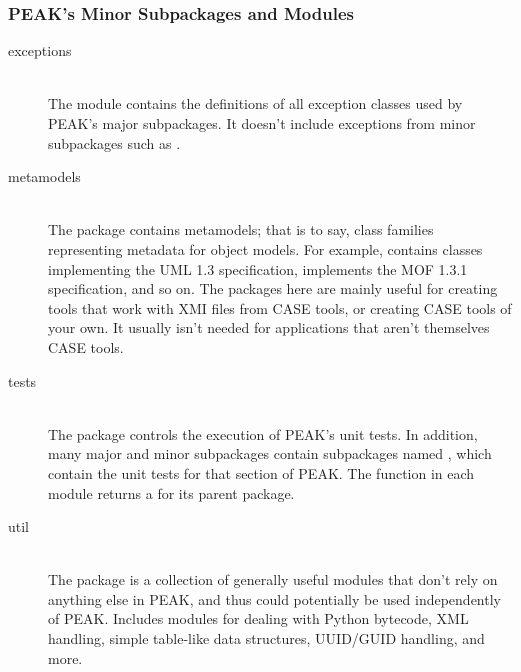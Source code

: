 \subsubsection{PEAK's Minor Subpackages and Modules}

\begin{description}

\item[exceptions] \hfill \\
The  module contains the definitions of all exception
classes used by PEAK's major subpackages.  It doesn't include exceptions from
minor subpackages such as .

\item[metamodels] \hfill \\
The  package contains metamodels; that is to say,
class families representing metadata for object models.  For example,
 contains classes implementing the UML 1.3
specification,  implements the MOF 1.3.1
specification, and so on.  The packages here are mainly useful for creating
tools that work with XMI files from CASE tools, or creating CASE tools of your
own.  It usually isn't needed for applications that aren't themselves CASE
tools.

\item[tests] \hfill \\
The  package controls the execution of PEAK's unit tests.
In addition, many major and minor subpackages contain subpackages named
, which contain the unit tests for that section of PEAK.  The
 function in each  module returns a
 for its parent package.

\item[util] \hfill \\
The  package is a collection of generally useful modules
that don't rely on anything else in PEAK, and thus could potentially be used
independently of PEAK.  Includes modules for dealing with Python bytecode,
XML handling, simple table-like data structures, UUID/GUID handling, and more.

\end{description}

